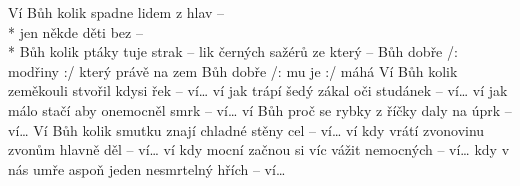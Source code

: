 \begin{TEXT}{Ví}
\SLOKA {} Bůh kolik  spadne  lidem z hlav \NL\hspace*{1cm}--    \\*
 jen někde  děti  bez  \NL\hspace*{1cm}--     \\*
 Bůh kolik  ptáky tuje strak --    \NL
{}lik černých sažérů ze který  --    
\REFREN     Bůh dobře /: modřiny :/ \NL
{} který právě na zem  \NL
Bůh dobře /:            mu je :/ \NL
{}máhá    
\SLOKA Ví Bůh kolik zeměkouli stvořil kdysi řek -- ví… \NL
ví jak trápí šedý zákal oči studánek -- ví… \NL
ví jak málo stačí aby onemocněl smrk -- ví… \NL
ví Bůh proč se rybky z říčky daly na úprk -- ví… 
\SLOKA Ví Bůh kolik smutku znají chladné stěny cel -- ví… \NL
ví kdy vrátí zvonovinu zvonům hlavně děl -- ví… \NL
ví kdy mocní začnou si víc vážit nemocných -- ví… \NL
kdy v nás umře aspoň jeden nesmrtelný hřích -- ví… \NL
\end{TEXT}
